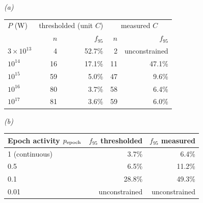 \emph{(a)}\\[2pt]
\begin{tabular}{@{}lrrrr@{}}
\toprule
$P$ (W) & \multicolumn{2}{c}{thresholded (unit $C$)} &
\multicolumn{2}{c}{measured $C$} \\
 & $n$ & $f_{95}$ & $n$ & $f_{95}$ \\
\midrule
$3\times10^{13}$ & 4 & 52.7\% & 2 & unconstrained \\
$10^{14}$ & 16 & 17.1\% & 11 & 47.1\% \\
$10^{15}$ & 59 & 5.0\% & 47 & 9.6\% \\
$10^{16}$ & 80 & 3.7\% & 58 & 6.4\% \\
$10^{17}$ & 81 & 3.6\% & 59 & 6.0\% \\
\bottomrule
\end{tabular}

\smallskip
\emph{(b)}\\[2pt]
\begin{tabular}{@{}lrr@{}}
\toprule
Epoch activity $p_{\rm epoch}$ & $f_{95}$ thresholded & $f_{95}$ measured \\
\midrule
1 (continuous) & 3.7\% & 6.4\% \\
0.5 & 6.5\% & 11.2\% \\
0.1 & 28.8\% & 49.3\% \\
0.01 & unconstrained & unconstrained \\
\bottomrule
\end{tabular}
